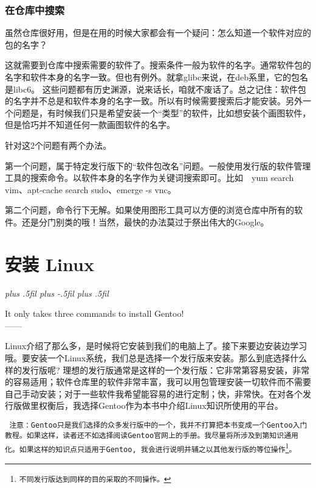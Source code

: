 \documentclass[amstex,twoside]{ctexbook}
\newenvironment{notice}{\tt}{}
\newcommand{\RTLpar}{%
  \leftskip=0pt plus .5fil%
  \rightskip=0pt plus -.5fil%
  \parfillskip=0pt plus .5fil%
}
\newenvironment{quotes}[2][0.55]{\pushQED{#2}%
\begin{flushright}%
\begin{minipage}{#1\textwidth}\begin{flushright}\noindent\it\RTLpar}{%
 \\------\popQED{}\end{flushright}\end{minipage}\end{flushright}\vskip 8mm }%
\begin{document}
\subsection*{在仓库中搜索}

虽然仓库很好用，但是在用的时候大家都会有一个疑问：怎么知道一个软件对应的包的名字？

这就需要到仓库中搜索需要的软件了。搜索条件一般为软件的名字。通常软件包的名字和软件本身的名字一致。但也有例外。就拿glibc来说，在deb系里，它的包名是libc6。
这些问题都有历史渊源，说来话长，咱就不废话了。总之记住：软件包的名字并不总是和软件本身的名字一致。所以有时候需要搜索后才能安装。另外一个问题是，有时候我们只是希望安装一个“类型”的软件，比如想安装个画图软件，但是恰巧并不知道任何一款画图软件的名字。

针对这2个问题有两个办法。

第一个问题，属于特定发行版下的“软件包改名”问题。一般使用发行版的软件管理工具的搜索命令。以软件本身的名字作为关键词搜索即可。比如　yum search vim、apt-cache search sudo、emerge -s vnc。

第二个问题，命令行下无解。如果使用图形工具可以方便的浏览仓库中所有的软件。还是分门别类的哦！当然，最快的办法莫过于祭出伟大的Google。

\chapter{安装 Linux}

\begin{quotes}[0.5]{insomnia}
It only takes three commands to install Gentoo!
\end{quotes}

Linux介绍了那么多，是时候将它安装到我们的电脑上了。接下来要边安装边学习哦。要安装一个Linux系统，我们总是选择一个发行版来安装。那么到底选择什么样的发行版呢? 理想的发行版通常是这样的一个发行版：它非常第容易安装，非常的容易适用；软件仓库里的软件非常丰富，我可以用包管理安装一切软件而不需要自己手动安装；对于一些软件我希望能容易的进行定制；快，非常快。在对各个发行版做里权衡后，我选择Gentoo作为本书中介绍Linux知识所使用的平台。


\begin{notice}
 注意：Gentoo只是我们选择的众多发行版中的一个，我并不打算把本书变成一个Gentoo入门教程。如果这样，读者还不如选择阅读Gentoo官网上的手册。我尽量将所涉及到第知识通用化。如果这样的知识点只适用于Gentoo, 我会进行说明并辅之以其他发行版的等位操作\footnote{不同发行版达到同样的目的采取的不同操作。}。
\end{notice}
\end{document}
